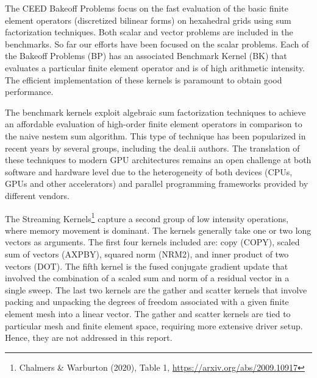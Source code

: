 \documentclass[a4paper,12pt]{article}
\begin{document}
The CEED Bakeoff Problems focus on the fast evaluation of the basic finite element operators (discretized bilinear forms) on hexahedral grids using sum factorization techniques. 
Both scalar and vector  problems are included in the benchmarks. So far our efforts have been focused on the scalar problems.
Each of the Bakeoff Problems (BP) has an associated Benchmark Kernel (BK) that evaluates a particular 
finite element operator and is of high arithmetic intensity. 
The efficient implementation of these kernels is paramount to obtain good performance. 

The benchmark kernels exploit algebraic sum factorization techniques to achieve an affordable evaluation of high-order finite element operators in comparison to the naive nestem sum algorithm. This type of technique has been popularized in recent years by several groups, including the deal.ii authors. The translation of these techniques to modern GPU architectures remains an open challenge at both software and hardware level due to the heterogeneity of both devices (CPUs, GPUs and other accelerators) and parallel programming frameworks provided by different vendors.

The Streaming Kernels\footnote{Chalmers \& Warburton (2020), Table 1, \url{https://arxiv.org/abs/2009.10917}} capture a second group of low intensity operations, where memory movement is dominant.
The kernels generally take one or two long vectors as arguments. 
The first four kernels included are: copy (COPY), scaled sum of vectors (AXPBY), squared norm (NRM2), and inner product of two vectors (DOT). 
The fifth kernel is the fused conjugate gradient update that involved the combination of a scaled sum and norm of a residual vector in a single sweep.    
The last two kernels are the gather and scatter kernels that involve packing and unpacking the degrees of freedom associated with a given finite element mesh into a linear vector.
The gather and scatter kernels are tied to particular mesh and finite element space, requiring more extensive driver setup. 
Hence, they are not addressed in this report.
\end{document}
